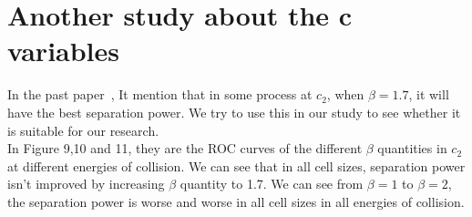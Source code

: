 \section*{Another study about the c variables}
In the past paper~\cite{Larkoski:2013eya}, It mention that in some process at $c_2$, when $\beta=1.7$, it will have the best separation power. We try to use this in our study to see whether it is suitable for our research.\\

In Figure 9,10 and 11, they are the ROC curves of the different $\beta$ quantities in $c_2$ at different energies of collision. We can see that in all cell sizes, separation power isn't improved by increasing $\beta$ quantity to 1.7. We can see from $\beta=1$ to $\beta=2$, the separation power is worse and worse in all cell sizes in all energies of collision.\\
\label{sec:c_variables_study}

